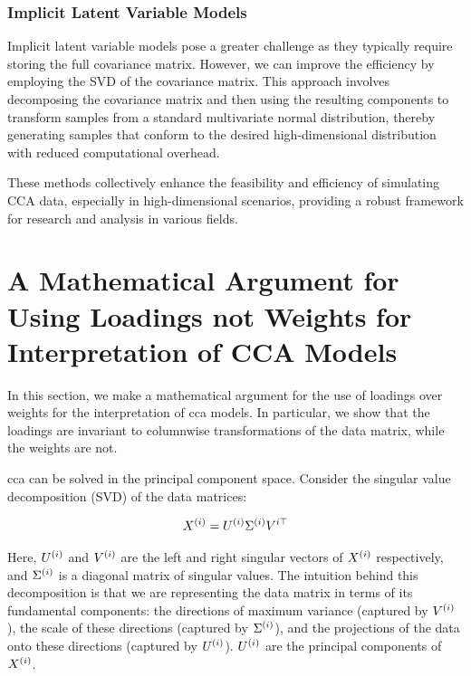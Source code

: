 \subsubsection{Implicit Latent Variable Models}
Implicit latent variable models pose a greater challenge as they typically require storing the full covariance matrix.
However, we can improve the efficiency by employing the SVD of the covariance matrix.
This approach involves decomposing the covariance matrix and then using the resulting components to transform samples from a standard multivariate normal distribution, thereby generating samples that conform to the desired high-dimensional distribution with reduced computational overhead.

These methods collectively enhance the feasibility and efficiency of simulating CCA data, especially in high-dimensional scenarios, providing a robust framework for research and analysis in various fields.

\section{A Mathematical Argument for Using Loadings not Weights for Interpretation of CCA Models}\label{sec:an-argument-for-the-use-of-loadings}

In this section, we make a mathematical argument for the use of \gls{loadings} over weights for the interpretation of \acrshort{cca} models.
In particular, we show that the \gls{loadings} are invariant to columnwise transformations of the data matrix, while the weights are not.

\acrshort{cca} can be solved in the principal component space. Consider the singular value decomposition (SVD) of the data matrices:

\begin{align}
    X^{(i)} = U^{(i)}\Sigma^{(i)}V^{i\top} \label{eq:svd}
\end{align}

Here, $U^{(i)}$ and $V^{(i)}$ are the left and right singular vectors of $X^{(i)}$ respectively, and $\Sigma^{(i)}$ is a diagonal matrix of singular values.
The intuition behind this decomposition is that we are representing the data matrix in terms of its fundamental components: the directions of maximum variance (captured by $V^{(i)}$), the scale of these directions (captured by $\Sigma^{(i)}$), and the projections of the data onto these directions (captured by $U^{(i)}$).
$U^{(i)}$ are the principal components of $X^{(i)}$.

